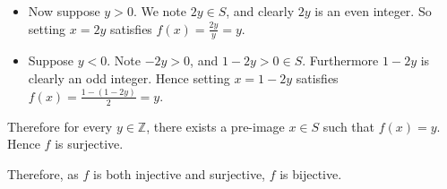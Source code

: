 \begin{enumerate}
\begin{itemize}
\begin{itemize}
            \item Now suppose $y > 0$. We note $2y \in S$, and clearly $2y$ is an even integer. So setting $x = 2y$ satisfies $f(x) = \frac{2y}{y} = y$.
            \item Suppose $y < 0$. Note $-2y > 0$, and $1 - 2y > 0 \in S$. Furthermore $1 - 2y$ is clearly an odd integer. Hence setting $x = 1 - 2y$ satisfies $f(x) = \frac{1-(1-2y)}{2} = y$.
        \end{itemize}
        Therefore for every $y \in \mathbb{Z}$, there exists a pre-image $x \in S$ such that $f(x) = y$. Hence $f$ is surjective.
    \end{itemize}
    Therefore, as $f$ is both injective and surjective, $f$ is bijective.
\end{enumerate}

